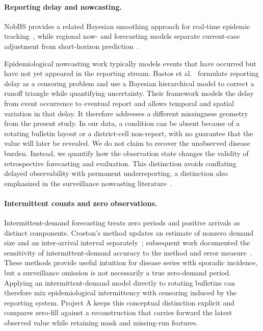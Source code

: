 \documentclass[runningheads]{llncs}
\begin{document}
\paragraph{Reporting delay and nowcasting.}

NobBS provides a related Bayesian smoothing approach for real-time epidemic tracking~\cite{greene2021nobbs}, while regional now- and forecasting models separate current-case adjustment from short-horizon prediction~\cite{vanderKassteele2022regional}.

Epidemiological nowcasting work typically models events that have occurred but have not yet appeared in the reporting stream. Bastos et al.~\cite{bastos2019reporting} formulate reporting delay as a censoring problem and use a Bayesian hierarchical model to correct a runoff triangle while quantifying uncertainty. Their framework models the delay from event occurrence to eventual report and allows temporal and spatial variation in that delay. It therefore addresses a different missingness geometry from the present study. In our data, a condition can be absent because of a rotating bulletin layout or a district-cell non-report, with no guarantee that the value will later be revealed. We do not claim to recover the unobserved disease burden. Instead, we quantify how the observation state changes the validity of retrospective forecasting and evaluation. This distinction avoids conflating delayed observability with permanent underreporting, a distinction also emphasized in the surveillance nowcasting literature~\cite{bastos2019reporting}.

\paragraph{Intermittent counts and zero observations.}

Intermittent-demand forecasting treats zero periods and positive arrivals as distinct components. Croston's method updates an estimate of nonzero demand size and an inter-arrival interval separately~\cite{croston1972forecasting}; subsequent work documented the sensitivity of intermittent-demand accuracy to the method and error measure~\cite{syntetos2005accuracy}. These methods provide useful intuition for disease series with sporadic incidence, but a surveillance omission is not necessarily a true zero-demand period. Applying an intermittent-demand model directly to rotating bulletins can therefore mix epidemiological intermittency with censoring induced by the reporting system. Project A keeps this conceptual distinction explicit and compares zero-fill against a reconstruction that carries forward the latest observed value while retaining mask and missing-run features.
\end{document}
